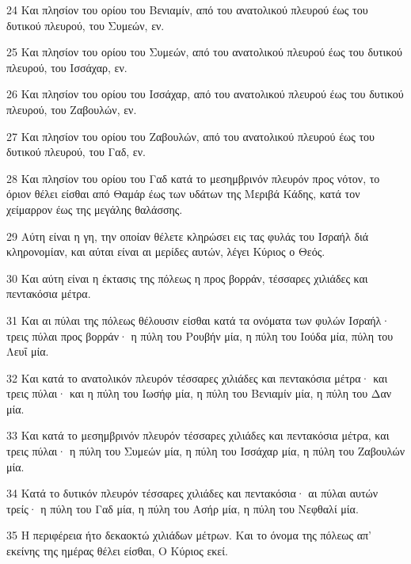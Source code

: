 \par 24 Και πλησίον του ορίου του Βενιαμίν, από του ανατολικού πλευρού έως του δυτικού πλευρού, του Συμεών, εν.
\par 25 Και πλησίον του ορίου του Συμεών, από του ανατολικού πλευρού έως του δυτικού πλευρού, του Ισσάχαρ, εν.
\par 26 Και πλησίον του ορίου του Ισσάχαρ, από του ανατολικού πλευρού έως του δυτικού πλευρού, του Ζαβουλών, εν.
\par 27 Και πλησίον του ορίου του Ζαβουλών, από του ανατολικού πλευρού έως του δυτικού πλευρού, του Γαδ, εν.
\par 28 Και πλησίον του ορίου του Γαδ κατά το μεσημβρινόν πλευρόν προς νότον, το όριον θέλει είσθαι από Θαμάρ έως των υδάτων της Μεριβά Κάδης, κατά τον χείμαρρον έως της μεγάλης θαλάσσης.
\par 29 Αύτη είναι η γη, την οποίαν θέλετε κληρώσει εις τας φυλάς του Ισραήλ διά κληρονομίαν, και αύται είναι αι μερίδες αυτών, λέγει Κύριος ο Θεός.
\par 30 Και αύτη είναι η έκτασις της πόλεως η προς βορράν, τέσσαρες χιλιάδες και πεντακόσια μέτρα.
\par 31 Και αι πύλαι της πόλεως θέλουσιν είσθαι κατά τα ονόματα των φυλών Ισραήλ· τρεις πύλαι προς βορράν· η πύλη του Ρουβήν μία, η πύλη του Ιούδα μία, πύλη του Λευΐ μία.
\par 32 Και κατά το ανατολικόν πλευρόν τέσσαρες χιλιάδες και πεντακόσια μέτρα· και τρεις πύλαι· και η πύλη του Ιωσήφ μία, η πύλη του Βενιαμίν μία, η πύλη του Δαν μία.
\par 33 Και κατά το μεσημβρινόν πλευρόν τέσσαρες χιλιάδες και πεντακόσια μέτρα, και τρεις πύλαι· η πύλη του Συμεών μία, η πύλη του Ισσάχαρ μία, η πύλη του Ζαβουλών μία.
\par 34 Κατά το δυτικόν πλευρόν τέσσαρες χιλιάδες και πεντακόσια· αι πύλαι αυτών τρείς· η πύλη του Γαδ μία, η πύλη του Ασήρ μία, η πύλη του Νεφθαλί μία.
\par 35 Η περιφέρεια ήτο δεκαοκτώ χιλιάδων μέτρων. Και το όνομα της πόλεως απ' εκείνης της ημέρας θέλει είσθαι, Ο Κύριος εκεί.



